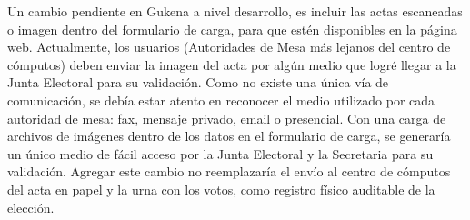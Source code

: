 Un cambio pendiente en Gukena a nivel desarrollo, es incluir las actas escaneadas o imagen dentro del formulario de carga, para que estén disponibles en la página web. Actualmente, los usuarios (Autoridades de Mesa más lejanos del centro de cómputos) deben enviar la imagen del acta por algún medio que logré llegar a la Junta Electoral para su validación. Como no existe una única vía de comunicación, se debía estar atento en reconocer el medio utilizado por cada autoridad de mesa: fax, mensaje privado, email o presencial. Con una carga de archivos de imágenes dentro de los datos en el formulario de carga, se generaría un único medio de fácil acceso por la Junta Electoral y la Secretaria para su validación.
Agregar este cambio no reemplazaría el envío al centro de cómputos del acta en papel y la urna con los votos, como registro físico auditable de la elección. 
